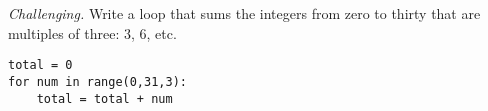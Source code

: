\documentclass[11pt]{exam}
\begin{document}
\begin{questions}
\item {\it Challenging.\/}
Write a loop that sums the integers from zero to thirty that are multiples of three:
3, 6, etc.

\begin{solution}
\begin{verbatim}
total = 0
for num in range(0,31,3):
    total = total + num
\end{verbatim}
\end{solution}


\begin{comment}
\item Suppose the current price of corn is \$1.20.
The price is set to increase by 10 cents every weekday until it hits \$2.50.
(Nothing happens on weekends.)
At that point it will switch directions and decrease by 10 cents a day.
Finish the code below to print the price of corn every day until it reaches \$2.50.
\begin{verbatim}
days = ["M", "T", "W", "Th", "F"]
starting_price = 1.20
current_price = starting_price
while True:
for day in days:
    current_price = current_price + 0.10
    print("The price on ", day, "is ", current_price)
if current_price == 2.50:
    break
\end{verbatim}
\end{comment}







\end{questions}
\end{document}
